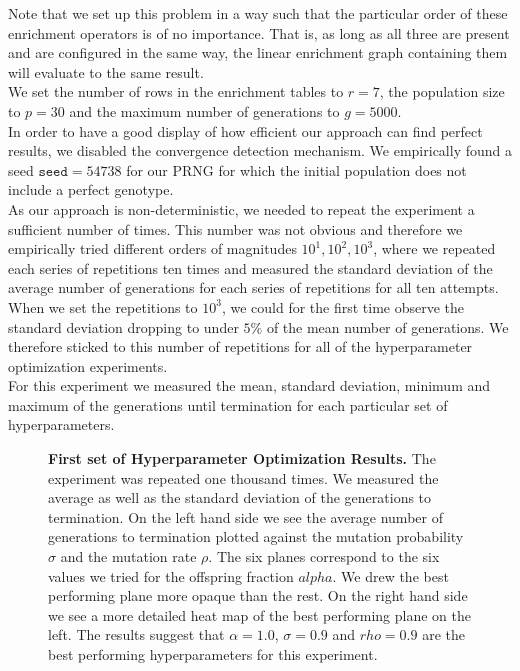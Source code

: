 Note that we set up this problem in a way such that the particular order of these enrichment operators is of no importance.
That is, as long as all three are present and are configured in the same way, the linear enrichment graph containing them will evaluate to the same result.\\

We set the number of rows in the enrichment tables to $r=7$, the population size to $p=30$ and the maximum number of generations to $g=5000$.\\

In order to have a good display of how efficient our approach can find perfect results, we disabled the convergence detection mechanism. 
We empirically found a seed $\texttt{seed}=54738$ for our \ac{PRNG} for which the initial population does not include a perfect genotype.\\

As our approach is non-deterministic, we needed to repeat the experiment a sufficient number of times.
This number was not obvious and therefore we empirically tried different orders of magnitudes $10^1, 10^2, 10^3$, where we repeated each series of repetitions ten times and measured the standard deviation of the average number of generations for each series of repetitions for all ten attempts.
When we set the repetitions to $10^3$, we could for the first time observe the standard deviation dropping to under $5\%$ of the mean number of generations.
We therefore sticked to this number of repetitions for all of the hyperparameter optimization experiments.\\

For this experiment we measured the mean, standard deviation, minimum and maximum of the generations until termination for each particular set of hyperparameters.

\begin{figure}[!tb]
\centering

\caption[First set of Hyperparameter Optimization Results]{\textbf{First set of Hyperparameter Optimization Results.} The experiment was repeated one thousand times. We measured the average as well as the standard deviation of the generations to termination. On the left hand side we see the average number of generations to termination plotted against the mutation probability $\sigma$ and the mutation rate $\rho$. The six planes correspond to the six values we tried for the offspring fraction $alpha$. We drew the best performing plane more opaque than the rest. On the right hand side we see a more detailed heat map of the best performing plane on the left. The results suggest that $\alpha=1.0$, $\sigma=0.9$ and $rho=0.9$ are the best performing hyperparameters for this experiment.}
\label{fig:eval1}  
\end{figure}

